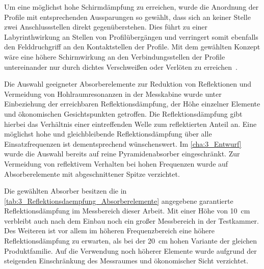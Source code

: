 \par
\vspace{\linespace}
Um eine möglichst hohe Schirmdämpfung zu erreichen, wurde die Anordnung der Profile mit entsprechenden Aussparungen so gewählt, dass sich an keiner Stelle zwei Anschlussstellen direkt gegenüberstehen. Dies führt zu einer Labyrinthwirkung an Stellen von Profilübergängen und verringert somit ebenfalls den Felddruchgriff an den Kontaktstellen der Profile. Mit dem gewählten Konzept wäre eine höhere Schirmwirkung an den Verbindungsstellen der Profile untereinander nur durch dichtes Verschweißen oder Verlöten zu erreichen~\cite{Design_of_shielded_enclosures, EM_Schirmung}. 
\par
\vspace{\linespace}


    






Die Auswahl geeigneter Absorberelemente zur Reduktion von Reflektionen und Vermeidung von Hohlraumresonanzen in der Messkabine wurde unter Einbeziehung der erreichbaren Reflektionsdämpfung, der Höhe einzelner Elemente und ökonomischen Gesichtspunkten getroffen. Die Reflektionsdämpfung gibt hierbei das Verhältnis einer eintreffenden Welle zum reflektierten Anteil an. Eine möglichst hohe und gleichbleibende Reflektionsdämpfung über alle Einsatzfrequenzen ist dementsprechend wünschenswert. Im \Abschnitt\ref{cha:3_Entwurf} wurde die Auswahl bereits auf reine Pyramidenabsorber eingeschränkt. Zur Vermeidung von reflektivem Verhalten bei hohen Frequenzen wurde auf Absorberelemente mit abgeschnittener Spitze verzichtet. 
\par
\vspace{\linespace}
Die gewählten Absorber besitzen die in \Tabelle\ref{tab:3_Reflektionsdaempfung_Absorberelemente} angegebene garantierte Reflektionsdämpfung im Messbereich dieser Arbeit. Mit einer Höhe von \SI{10}{\centi\meter}  verbleibt auch nach dem Einbau noch ein großer Messbereich in der Testkammer. Des Weiteren ist vor allem im höheren Frequenzbereich eine höhere Reflektionsdämpfung zu erwarten, als bei der \SI{20}{\centi\meter} hohen Variante der gleichen Produktfamilie. Auf die Verwendung noch höherer Elemente wurde aufgrund der steigenden Einschränkung des Messraumes und ökonomischer Sicht verzichtet.  


